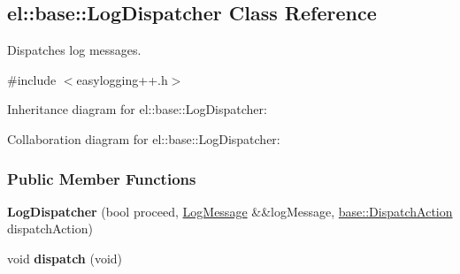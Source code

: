 \hypertarget{a00045}{}\subsection{el\+:\+:base\+:\+:Log\+Dispatcher Class Reference}
\label{a00045}


Dispatches log messages.  




{\ttfamily \#include $<$easylogging++.\+h$>$}



Inheritance diagram for el\+:\+:base\+:\+:Log\+Dispatcher\+:


Collaboration diagram for el\+:\+:base\+:\+:Log\+Dispatcher\+:
\subsubsection*{Public Member Functions}
\begin{DoxyCompactItemize}
\item 
\hypertarget{a00045_aef59d9895c348f0b3ad5a776276f1c22}{}{\bfseries Log\+Dispatcher} (bool proceed, \hyperlink{a00050}{Log\+Message} \&\&log\+Message, \hyperlink{a00184_a3aa2563d38e47388ba242a1694fc2839}{base\+::\+Dispatch\+Action} dispatch\+Action)\label{a00045_aef59d9895c348f0b3ad5a776276f1c22}

\item 
\hypertarget{a00045_a88d4a644364bb454136c85338f05da7a}{}void {\bfseries dispatch} (void)\label{a00045_a88d4a644364bb454136c85338f05da7a}

\end{DoxyCompactItemize}
